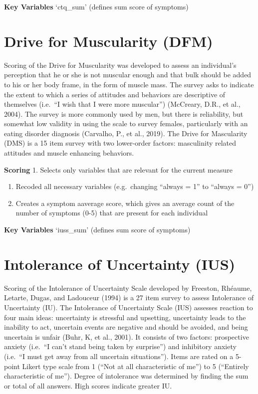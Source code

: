 \documentclass[
]{book}
\begin{document}
\textbf{Key Variables}
`ctq\_sum' (defines sum score of symptoms)

\hypertarget{drive-for-muscularity-dfm}{%
\section{Drive for Muscularity (DFM)}\label{drive-for-muscularity-dfm}}

Scoring of the Drive for Muscularity was developed to assess an individual's perception that he or she is not muscular enough and that bulk should be added to his or her body frame, in the form of muscle mass. The survey asks to indicate the extent to which a series of attitudes and behaviors are descriptive of themselves (i.e.~``I wish that I were more muscular'') (McCreary, D.R., et al., 2004). The survey is more commonly used by men, but there is reliability, but somewhat low validity in using the scale to survey females, particularly with an eating disorder diagnosis (Carvalho, P., et al., 2019). The Drive for Mascularity (DMS) is a 15 item survey with two lower-order factors: masculinity related attitudes and muscle enhancing behaviors.

\textbf{Scoring}
1. Selects only variables that are relevant for the current measure

\begin{enumerate}
\def\labelenumi{\arabic{enumi}.}
\setcounter{enumi}{1}
\item
  Recoded all necessary variables (e.g.~changing ``always = 1'' to ``always = 0'')
\item
  Creates a symptom aaverage score, which gives an average count of the number of symptoms (0-5) that are present for each individual
\end{enumerate}

\textbf{Key Variables}
`iuss\_sum' (defines sum score of symptoms)

\hypertarget{intolerance-of-uncertainty-ius}{%
\section{Intolerance of Uncertainty (IUS)}\label{intolerance-of-uncertainty-ius}}

Scoring of the Intolerance of Uncertainty Scale developed by Freeston, Rhéaume, Letarte, Dugas, and Ladouceur (1994) is a 27 item survey to assess Intolerance of Uncertainty (IU). The Intolerance of Uncertainty Scale (IUS) assesses reaction to four main ideas: uncertainty is stressful and upsetting, uncertainty leads to the inability to act, uncertain events are negative and should be avoided, and being uncertain is unfair (Buhr, K, et al., 2001). It consists of two factors: prospective anxiety (i.e.~``I can't stand being taken by surprise'') and inhibitory anxiety (i.e.~``I must get away from all uncertain situations''). Items are rated on a 5-point Likert type scale from 1 (``Not at all characteristic of me'') to 5 (``Entirely characteristic of me''). Degree of intolerance was determined by finding the sum or total of all answers. High scores indicate greater IU.
\end{document}
